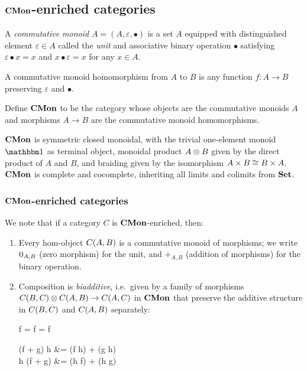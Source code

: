 \subsection{$\mathbf{CMon}$-enriched categories}

\begin{definition}
A \emph{commutative monoid} $A = (A, \varepsilon, \bullet)$ is a set $A$ equipped with distinguished element
$\varepsilon \in A$ called the \emph{unit} and associative binary operation $\bullet$ satisfying $\varepsilon
\bullet x = x$ and $x \bullet \varepsilon = x$ for any $x \in A$.
\end{definition}

A commutative monoid homomorphism from $A$ to $B$ is any function $f: A \to B$ preserving $\varepsilon$ and
$\bullet$.

\begin{definition}
Define $\mathbf{CMon}$ to be the category whose objects are the commutative monoids $A$ and morphisms $A \to B$ are
the commutative monoid homomorphisms.
\end{definition}

$\mathbf{CMon}$ is symmetric closed monoidal, with the trivial one-element monoid $\One$ as terminal object, monoidal
product $A \otimes B$ given by the direct product of $A$ and $B$, and braiding given by the isomorphism $A
\times B \cong B \times A$. $\mathbf{CMon}$ is complete and cocomplete, inheriting all limits and colimits from $\mathbf{Set}$.

\subsubsection{$\mathbf{CMon}$-enriched categories}

We note that if a category $C$ is $\mathbf{CMon}$-enriched, then:
\begin{enumerate}
\item Every hom-object ${C}(A,B)$ is a commutative monoid of morphisms; we write $0_{A,B}$ (zero
morphism) for the unit, and $+_{A,B}$ (addition of morphisms) for the binary operation.
\item Composition is \emph{biadditive}, i.e.~given by a family of morphisms ${C}(B,C) \otimes
{C}(A,B) \to {C}(A,C)$ in $\mathbf{CMon}$ that preserve the additive structure in ${C}(B,C)$ and
${C}(A,B)$ separately:

\begin{salign*}
f \comp \zero = f = \zero \comp f
\end{salign*}
\begin{salign*}
(f + g) \comp h &= (f \comp h) + (g \comp h) \\
h \comp (f + g) &= (h \comp f) + (h \comp g)
\end{salign*}
\end{enumerate}

